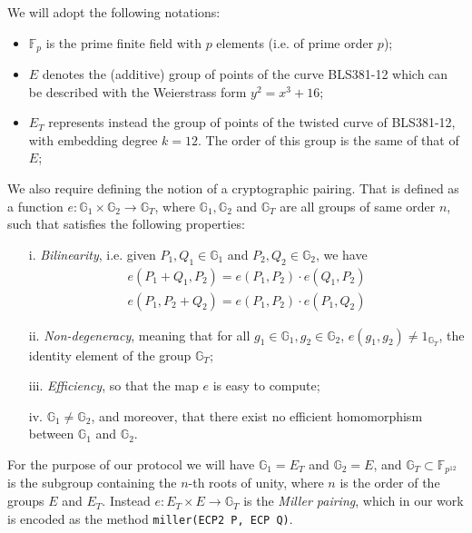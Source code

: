 \documentclass[conference]{IEEEtran}
\begin{document}
We will adopt the following notations:
\begin{itemize}

\item $\mathbb{F}_p$ is the prime finite field with $p$ elements
  (i.e. of prime order $p$);

\item $E$ denotes the (additive) group of points of the curve
  BLS381-12 \cite{bls381-12} which can be described with the
  Weierstrass form $y^2=x^3 + 16$;

\item $E_T$ represents instead the group of points of the twisted
  curve of BLS381-12, with embedding degree $k=12$. The order of
  this group is the same of that of $E$;

\end{itemize}

We also require defining the notion of a cryptographic
pairing. That is defined as a function $e:
\mathbb{G}_1\times\mathbb{G}_2\to \mathbb{G}_T$, where
$\mathbb{G}_1,\mathbb{G}_2$ and $\mathbb{G}_T$ are all groups of same
order $n$, such that satisfies the following properties:

\begin{itemize}

\item [i.] \emph{Bilinearity}, i.e. given $P_1,Q_1\in\mathbb{G}_1$
  and $P_2,Q_2\in\mathbb{G}_2$, we have
  \begin{align*}
    e(P_1+Q_1,P_2) = e(P_1,P_2)\cdot e(Q_1,P_2) \\
    e(P_1,P_2+Q_2) = e(P_1,P_2)\cdot e(P_1,Q_2)
  \end{align*}

\item[ii.] \emph{Non-degeneracy}, meaning that for all
  $g_1\in\mathbb{G}_1, g_2\in\mathbb{G}_2$, $e(g_1,g_2)\ne
  1_{\mathbb{G}_T}$, the identity element of the group
  $\mathbb{G}_T$;

\item[iii.] \emph{ Efficiency}, so that the map $e$ is easy to
  compute;

\item[iv. ] $\mathbb{G}_1\ne \mathbb{G}_2$, and moreover, that
  there exist no efficient homomorphism between $\mathbb{G}_1$ and
  $\mathbb{G}_2$.

\end{itemize}

For the purpose of our protocol we will have $\mathbb{G}_1 = E_T$ and
$\mathbb{G}_2 = E$, and $\mathbb{G}_T\subset \mathbb{F}_{p^{12}}$ is
the subgroup containing the $n$-th roots of unity, where $n$ is the
order of the groups $E$ and $E_T$. Instead $e: E_T \times E\to
\mathbb{G}_T$ is the \emph{Miller pairing}, which in our work is
encoded as the method \verb!miller(ECP2 P, ECP Q)!. \\
\end{document}
